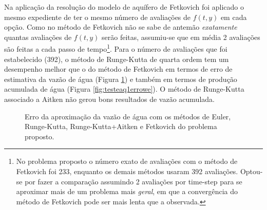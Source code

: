 \documentclass[final,5p]{elsarticle}
\numberwithin{equation}{section}
\begin{document}
        Na aplicação da resolução do modelo de aquífero de Fetkovich foi aplicado o mesmo expediente de ter o mesmo número de avaliações de $f(t,y)$ em cada opção. Como no método de Fetkovich não se sabe de antemão \emph{exatamente} quantas avaliações de $f(t,y)$ serão feitas, assumiu-se que em média 2 avaliações são feitas a cada passo de tempo\footnote{No problema proposto o número exato de avaliações com o método de Fetkovich foi 233, enquanto os demais métodos usaram 392 avaliações. Optou-se por fazer a comparação assumindo 2 avaliações por time-step para se aproximar mais de um problema mais \emph{geral}, em que a convergência do método de Fetkovich pode ser mais lenta que a observada.}. Para o número de avaliações que foi estabelecido (392), o método de Runge-Kutta de quarta ordem tem um desempenho melhor que o do método de Fetkovich em termos de erro de estimativa da vazão de água (Figura \ref{fig:testeaq1erroqw}) e também em termos de produção acumulada de água (Figura \ref{fig:testeaq1errowe}). O método de Runge-Kutta associado a Aitken não gerou bons resultados de vazão acumulada.

        \begin{figure}[hbt!]
            \caption{Erro da aproximação da vazão de água com os métodos de Euler, Runge-Kutta, Runge-Kutta+Aitken e Fetkovich do problema proposto.}
            \label{fig:testeaq1erroqw}
        \end{figure}
\end{document}
